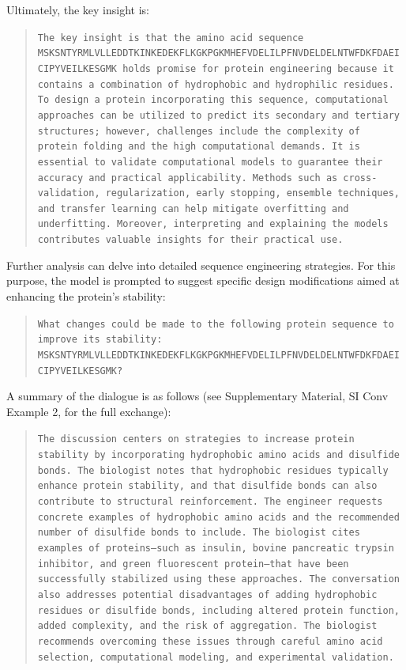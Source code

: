 Ultimately, the key insight is:

\begin{quote}
\small\texttt{The key insight is that the amino acid sequence MSKSNTYRMLVLLEDDTKINKEDEKFLKGKPGKMHEFVDELILPFNVDELDELNTWFDKFDAEICIPYVEILKESGMK holds promise for protein engineering because it contains a combination of hydrophobic and hydrophilic residues. To design a protein incorporating this sequence, computational approaches can be utilized to predict its secondary and tertiary structures; however, challenges include the complexity of protein folding and the high computational demands. It is essential to validate computational models to guarantee their accuracy and practical applicability. Methods such as cross-validation, regularization, early stopping, ensemble techniques, and transfer learning can help mitigate overfitting and underfitting. Moreover, interpreting and explaining the models contributes valuable insights for their practical use.}
\end{quote}

Further analysis can delve into detailed sequence engineering strategies. For this purpose, the model is prompted to suggest specific design modifications aimed at enhancing the protein’s stability:

\begin{quote}
\small\texttt{What changes could be made to the following protein sequence to improve its stability: MSKSNTYRMLVLLEDDTKINKEDEKFLKGKPGKMHEFVDELILPFNVDELDELNTWFDKFDAEICIPYVEILKESGMK?}
\end{quote}

A summary of the dialogue is as follows (see Supplementary Material, SI Conv Example 2, for the full exchange):

\begin{quote}
\small\texttt{The discussion centers on strategies to increase protein stability by incorporating hydrophobic amino acids and disulfide bonds. The biologist notes that hydrophobic residues typically enhance protein stability, and that disulfide bonds can also contribute to structural reinforcement. The engineer requests concrete examples of hydrophobic amino acids and the recommended number of disulfide bonds to include. The biologist cites examples of proteins—such as insulin, bovine pancreatic trypsin inhibitor, and green fluorescent protein—that have been successfully stabilized using these approaches. The conversation also addresses potential disadvantages of adding hydrophobic residues or disulfide bonds, including altered protein function, added complexity, and the risk of aggregation. The biologist recommends overcoming these issues through careful amino acid selection, computational modeling, and experimental validation.}
\end{quote}

